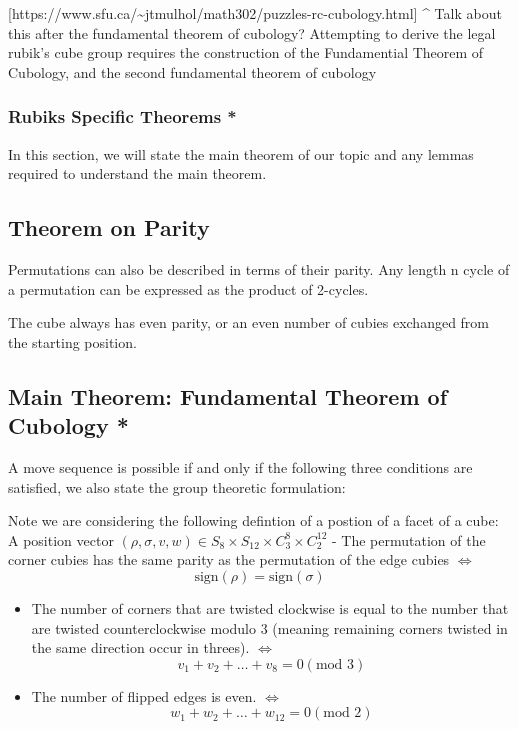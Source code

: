 {[}https://www.sfu.ca/\textasciitilde jtmulhol/math302/puzzles-rc-cubology.html{]}
\^{} Talk about this after the fundamental theorem of cubology?
Attempting to derive the legal rubik's cube group requires the
construction of the Fundamential Theorem of Cubology, and the second
fundamental theorem of cubology

\subsubsection{Rubiks Specific Theorems
*}\label{rubiks-specific-theorems}

In this section, we will state the main theorem of our topic and any
lemmas required to understand the main theorem.

\subsection{Theorem on Parity}\label{theorem-on-parity}

Permutations can also be described in terms of their parity. Any length
n cycle of a permutation can be expressed as the product of 2-cycles.

The cube always has even parity, or an even number of cubies exchanged
from the starting position.

\subsection{Main Theorem: Fundamental Theorem of Cubology
*}\label{main-theorem-fundamental-theorem-of-cubology}

A move sequence is possible if and only if the following three
conditions are satisfied, we also state the group theoretic formulation:

Note we are considering the following defintion of a postion of a facet
of a cube: A position vector
\((\rho,\sigma,v,w) \in S_{8} \times S_{12} \times C_{3}^{8} \times C_{2}^{12}\)
- The permutation of the corner cubies has the same parity as the
permutation of the edge cubies \(\Leftrightarrow\)
\[\text{sign}(\rho) = \text{sign}(\sigma)\]

\begin{itemize}
\tightlist
\item
  The number of corners that are twisted clockwise is equal to the
  number that are twisted counterclockwise modulo \(3\) (meaning
  remaining corners twisted in the same direction occur in threes).
  \(\Leftrightarrow\)
  \[v_{1} + v_{2} +\dots +v_{8} = 0 (\text{mod } 3)\]
\item
  The number of flipped edges is even. \(\Leftrightarrow\)
  \[w_{1} + w_{2} +\dots +w_{12} = 0 (\text{mod } 2)\]
\end{itemize}


